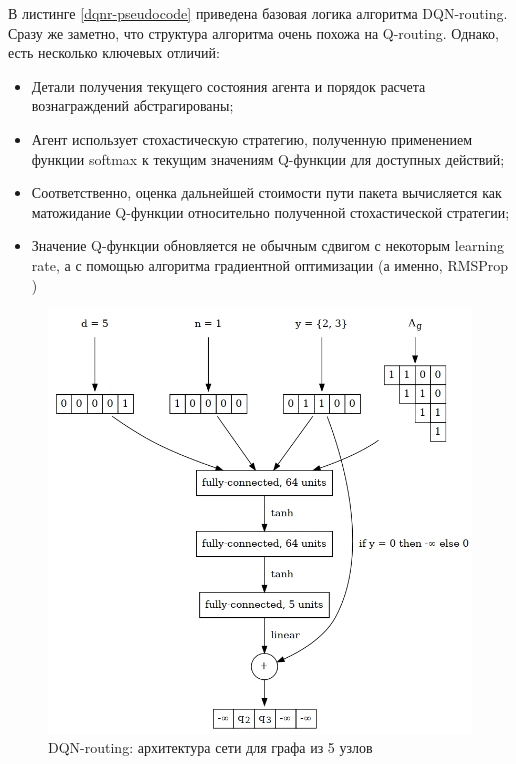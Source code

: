 \documentclass[specification,annotation,times]{itmo-student-thesis}
\theoremstyle{definition}
\begin{document}
В листинге \ref{dqnr-pseudocode} приведена базовая логика алгоритма DQN-routing.
Сразу же заметно, что структура алгоритма очень похожа на Q-routing. Однако,
есть несколько ключевых отличий:

\begin{itemize}
\item Детали получения текущего состояния агента и порядок расчета
  вознаграждений абстрагированы;
\item Агент использует стохастическую стратегию, полученную применением функции
  softmax к текущим значениям Q-функции для доступных действий;
\item Соответственно, оценка дальнейшей стоимости пути пакета вычисляется как
  матожидание Q-функции относительно полученной стохастической стратегии;
\item Значение Q-функции обновляется не обычным сдвигом с некоторым learning
  rate, а с помощью алгоритма градиентной оптимизации (а именно, RMSProp \cite{tieleman2012lecture})
\end{itemize}

\begin{figure}[!h]
  \caption{DQN-routing: архитектура сети для графа из 5 узлов}\label{nn-pic-2}
  \centering
  \includegraphics[scale=0.5]{nn-2}
\end{figure}
\end{document}
